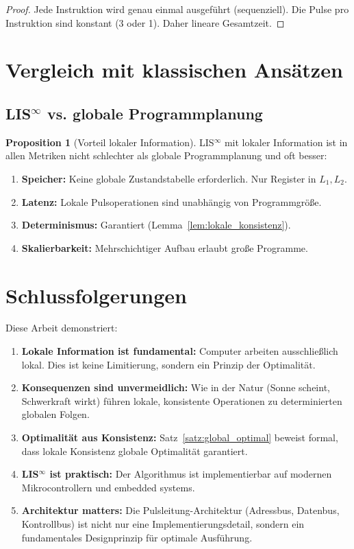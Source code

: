 \documentclass[a4paper,12pt]{article}
\theoremstyle{definition}
\newtheorem{proposition}{Proposition}
\begin{document}
\begin{proof}
	Jede Instruktion wird genau einmal ausgeführt (sequenziell). Die Pulse pro Instruktion sind konstant (3 oder 1). Daher lineare Gesamtzeit.
\end{proof}

\section{Vergleich mit klassischen Ansätzen}

\subsection[LIS-infty vs. globale Programmplanung]{LIS$^{\infty}$ vs. globale Programmplanung}

\begin{proposition}[Vorteil lokaler Information]
	LIS$^{\infty}$ mit lokaler Information ist in allen Metriken nicht schlechter als globale Programmplanung und oft besser:
	\begin{enumerate}
		\item \textbf{Speicher:} Keine globale Zustandstabelle erforderlich. Nur Register in $L_1, L_2$.
		\item \textbf{Latenz:} Lokale Pulsoperationen sind unabhängig von Programmgröße.
		\item \textbf{Determinismus:} Garantiert (Lemma~\ref{lem:lokale_konsistenz}).
		\item \textbf{Skalierbarkeit:} Mehrschichtiger Aufbau erlaubt große Programme.
	\end{enumerate}
\end{proposition}

\section{Schlussfolgerungen}

Diese Arbeit demonstriert:

\begin{enumerate}
	\item \textbf{Lokale Information ist fundamental:} Computer arbeiten ausschließlich lokal. Dies ist keine Limitierung, sondern ein Prinzip der Optimalität.
	
	\item \textbf{Konsequenzen sind unvermeidlich:} Wie in der Natur (Sonne scheint, Schwerkraft wirkt) führen lokale, konsistente Operationen zu determinierten globalen Folgen.
	
	\item \textbf{Optimalität aus Konsistenz:} Satz~\ref{satz:global_optimal} beweist formal, dass lokale Konsistenz globale Optimalität garantiert.
	
	\item \textbf{LIS$^{\infty}$ ist praktisch:} Der Algorithmus ist implementierbar auf modernen Mikrocontrollern und embedded systems.
	
	\item \textbf{Architektur matters:} Die Pulsleitung-Architektur (Adressbus, Datenbus, Kontrollbus) ist nicht nur eine Implementierungsdetail, sondern ein fundamentales Designprinzip für optimale Ausführung.
\end{enumerate}
\end{document}
